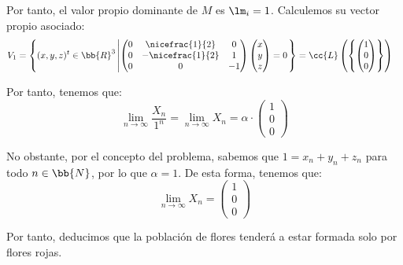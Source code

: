 \begin{ejemplo}
    Por tanto, el valor propio dominante de $M$ es $\lm_i=1$. Calculemos su vector propio asociado:
    \begin{align*}
        V_1 &= \left\{(x,y,z)^t\in \bb{R}^3 \left|\begin{pmatrix}
            0 & \nicefrac{1}{2} & 0 \\
            0 & -\nicefrac{1}{2} & 1 \\
            0 & 0 & -1 \\
        \end{pmatrix}\begin{pmatrix}
            x\\y\\z
        \end{pmatrix}=0\right.\right\}
        = \cc{L}\left(\left\{\begin{pmatrix}
            1\\0\\0
        \end{pmatrix}\right\}\right)
    \end{align*}

    Por tanto, tenemos que:
    \begin{equation*}
        \lim_{n\to \infty} \frac{X_n}{1^n} = 
        \lim_{n\to \infty} X_n = \alpha \cdot \begin{pmatrix}
            1 \\ 0 \\ 0
        \end{pmatrix}
    \end{equation*}

    No obstante, por el concepto del problema, sabemos que $1=x_n+y_n+z_n$ para todo $n\in \bb{N}$, por lo que $\alpha=1$. De esta forma, tenemos que:
    \begin{equation*}
        \lim_{n\to \infty} X_n = \begin{pmatrix}
            1 \\ 0 \\ 0
        \end{pmatrix}
    \end{equation*}

    Por tanto, deducimos que la población de flores tenderá a estar formada solo por flores rojas.
\end{ejemplo}